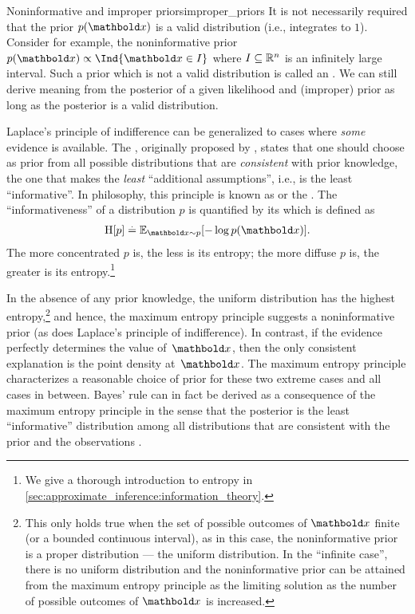 \begin{rmk}{Noninformative and improper priors}{improper_priors}
  It is not necessarily required that the prior $p(\vx)$ is a valid distribution (i.e., integrates to $1$).
  Consider for example, the noninformative prior $p(\vx) \propto \Ind{\vx \in I}$ where $I \subseteq \mathbb{R}^n$ is an infinitely large interval.
  Such a prior which is not a valid distribution is called an .
  We can still derive meaning from the posterior of a given likelihood and (improper) prior as long as the posterior is a valid distribution.
\end{rmk}

Laplace's principle of indifference can be generalized to cases where \emph{some} evidence is available.
The , originally proposed by \cite{jaynes1968prior}, states that one should choose as prior from all possible distributions that are \emph{consistent} with prior knowledge, the one that makes the \emph{least} ``additional assumptions'', i.e., is the least ``informative''.
In philosophy, this principle is known as  or the .
The ``informativeness'' of a distribution $p$ is quantified by its  which is defined as \begin{align}
  \H{p} \defeq \E[\vx \sim p]{- \log p(\vx)}. \label{eq:mep_entropy}
\end{align}
The more concentrated $p$ is, the less is its entropy; the more diffuse $p$ is, the greater is its entropy.\footnote{We give a thorough introduction to entropy in \cref{sec:approximate_inference:information_theory}.}

In the absence of any prior knowledge, the uniform distribution has the highest entropy,\footnote{This only holds true when the set of possible outcomes of $\vx$ finite (or a bounded continuous interval), as in this case, the noninformative prior is a proper distribution --- the uniform distribution. In the ``infinite case'', there is no uniform distribution and the noninformative prior can be attained from the maximum entropy principle as the limiting solution as the number of possible outcomes of $\vx$ is increased.} and hence, the maximum entropy principle suggests a noninformative prior (as does Laplace's principle of indifference).
In contrast, if the evidence perfectly determines the value of~$\vx$, then the only consistent explanation is the point density at~$\vx$.
The maximum entropy principle characterizes a reasonable choice of prior for these two extreme cases and all cases in between.
Bayes' rule can in fact be derived as a consequence of the maximum entropy principle in the sense that the posterior is the least ``informative'' distribution among all distributions that are consistent with the prior and the observations .


